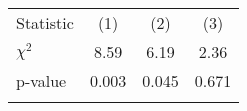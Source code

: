 \begin{center}
\begin{tabular}{lccc}
\hline \noalign{\smallskip}Statistic & (1) & (2) & (3)\\
\noalign{\smallskip}\hline \noalign{\smallskip}$\chi^2$ & 8.59 & 6.19 & 2.36\\
p-value & 0.003 & 0.045 & 0.671\\
\noalign{\smallskip}\hline\end{tabular}\\
\end{center}

